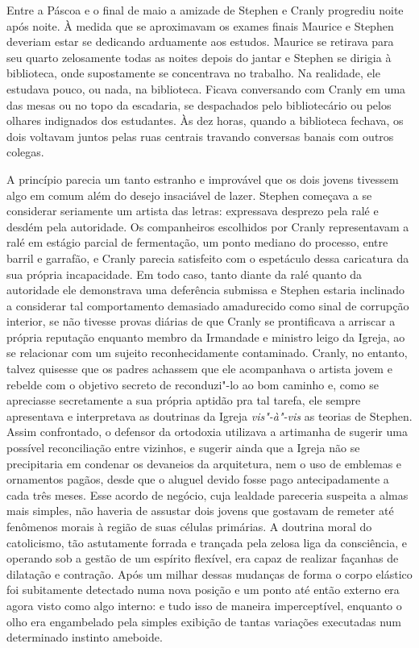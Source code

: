 Entre a Páscoa e o final de maio a amizade de Stephen e Cranly progrediu noite
após noite.  À medida que se aproximavam os exames finais Maurice e Stephen
deveriam estar se dedicando arduamente aos estudos.  Maurice se retirava para
seu quarto zelosamente todas as noites depois do jantar e Stephen se dirigia à
biblioteca, onde supostamente se concentrava no trabalho.  Na realidade, ele
estudava pouco, ou nada, na biblioteca.  Ficava conversando com Cranly em uma
das mesas ou no topo da escadaria, se despachados pelo bibliotecário ou pelos
olhares indignados dos estudantes.  Às dez horas, quando a biblioteca fechava,
os dois voltavam juntos pelas ruas centrais travando conversas banais com
outros colegas.

A princípio parecia um tanto estranho e improvável que os dois jovens tivessem
algo em comum além do desejo insaciável de lazer.  Stephen começava a se
considerar seriamente um artista das letras: expressava desprezo pela ralé e
desdém pela autoridade.  Os companheiros escolhidos por Cranly representavam a
ralé em estágio parcial de fermentação, um ponto mediano do processo, entre
barril e garrafão, e Cranly parecia satisfeito com o espetáculo dessa
caricatura da sua própria incapacidade.  Em todo caso, tanto diante da ralé
quanto da autoridade ele demonstrava uma deferência submissa e Stephen estaria
inclinado a considerar tal comportamento demasiado amadurecido como sinal de
corrupção interior, se não tivesse provas diárias de que Cranly se prontificava
a arriscar a própria reputação enquanto membro da Irmandade e ministro leigo da
Igreja, ao se relacionar com um sujeito reconhecidamente contaminado.  Cranly,
no entanto, talvez quisesse que os padres achassem que ele acompanhava o
artista jovem e rebelde com o objetivo secreto de reconduzi"-lo ao bom caminho
e, como se apreciasse secretamente a sua própria aptidão pra tal tarefa, ele
sempre apresentava e interpretava as doutrinas da Igreja \textit{vis"-à"-vis} as		
teorias de Stephen.  Assim confrontado, o defensor da ortodoxia utilizava a
artimanha de sugerir uma possível reconciliação entre vizinhos, e sugerir
ainda que a Igreja não se precipitaria em condenar os devaneios da
arquitetura, nem o uso de emblemas e ornamentos pagãos, desde que o aluguel
devido fosse pago antecipadamente a cada três meses.  Esse acordo de negócio,
cuja lealdade pareceria suspeita a almas mais simples, não haveria de assustar
dois jovens que gostavam de remeter até fenômenos morais à região de suas
células primárias.  A doutrina moral do catolicismo, tão astutamente forrada e
trançada pela zelosa liga da consciência, e operando sob a gestão de um
espírito flexível, era capaz de realizar façanhas de dilatação e contração.
Após um milhar dessas \label{mudancas"-de} mudanças de forma o corpo elástico foi subitamente
detectado numa nova posição e um ponto até então externo era agora visto como
algo interno: e tudo isso de maneira imperceptível, enquanto o olho era
engambelado pela simples exibição de tantas variações executadas num
determinado instinto ameboide.

